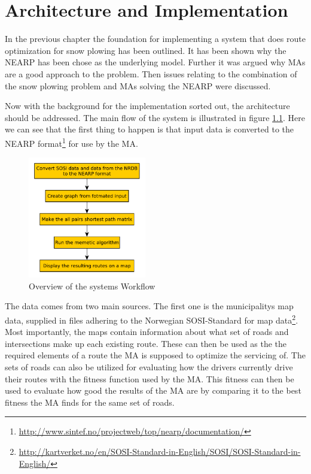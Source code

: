 \chapter{Architecture and Implementation}

In the previous chapter the foundation for implementing a system that does route optimization for snow plowing has been outlined. It has been shown why the NEARP has been chose as the underlying model. Further it was argued why MAs are a good approach to the problem. Then issues relating to the combination of the snow plowing problem and MAs solving the NEARP were discussed.

Now with the background for the implementation sorted out, the architecture should be addressed. The main flow of the system is illustrated in figure \ref{fig:system_flowchart}. Here we can see that the first thing to happen is that input data is converted to the NEARP format\footnote{\url{http://www.sintef.no/projectweb/top/nearp/documentation/}} for use by the MA.

\begin{figure}
	\begin{center}
		\includegraphics[width=0.46\textwidth]{figures/Architecture/Overal_system_workflow.pdf}
	\end{center}
	\caption{Overview of the systems Workflow}
	\label{fig:system_flowchart}
\end{figure}

The data comes from two main sources. The first one is the municipalitys map data, supplied in files adhering to the Norwegian SOSI-Standard for map data\footnote{\url{http://kartverket.no/en/SOSI-Standard-in-English/SOSI/SOSI-Standard-in-English/}}. Most importantly, the maps contain information about what set of roads and intersections make up each existing route. These can then be used as the the required elements of a route the MA is supposed to optimize the servicing of. The sets of roads can also be utilized for evaluating how the drivers currently drive their routes with the fitness function used by the MA. This fitness can then be used to evaluate how good the results of the MA are by comparing it to the best fitness the MA finds for the same set of roads.


